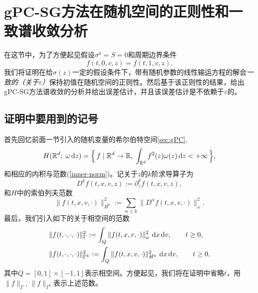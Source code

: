 


\section{gPC-SG方法在随机空间的正则性和一致谱收敛分析}\label{sec:unif}

在这节中，为了方便起见假设$\sigma^a=S=0$和周期边界条件
\begin{equation}\label{PBC}
  f(t, 0, v, z) = f(t, 1, v, z).
\end{equation}
我们将证明在给$\sigma(z)$一定的假设条件下，带有随机参数的线性输运方程的解会{\it 一致的（关于$\varepsilon$）}保持初值在随机空间的正则性。然后基于该正则性的结果，给出gPC-SG方法谱收敛的分析并给出误差估计，并且该误差估计是不依赖于$\varepsilon$的。

\subsection{证明中要用到的记号}
首先回忆前面一节引入的随机变量的希尔伯特空间\ref{sec:gPC},
\begin{equation}
  H({\mathbb{R}}^d;\;\omega\mathop{}\!\mathrm{d} z) = \Big\{\,f\mid {\mathbb{R}}^d \rightarrow {\mathbb{R}}, \;\int_{{\mathbb{R}}^d} f^2(z)\omega(z)\mathop{}\!\mathrm{d} z < +\infty\,\Big\},
\end{equation}
和相应的内积与范数(\ref{inner-norm})。记关于$z$的$k$阶求导算子为
\begin{equation}
  D^k f(t,x,v,z) := \partial^k_z f(t,x,v,z),
\end{equation}
和$H$中的索伯列夫范数
\begin{equation}
  \|f(t,x,v,\cdot)\|_{H^k}^2 := \sum_{\alpha\le k} \|D^\alpha f(t,x,v,\cdot)\|_\omega^2.
\end{equation}
最后，我们引入如下的关于相空间的范数
\begin{align}
  & \|f(t,\cdot,\cdot,\cdot)\|_{\Gamma}^2:=\int_Q \|f(t,x,v,\cdot)\|_{\omega}^2\,\mathop{}\!\mathrm{d} x\mathop{}\!\mathrm{d} v,\qquad t\geq 0,
  \\
  & \|f(t,\cdot,\cdot,\cdot)\|_{\Gamma^k}^2:=\int_Q \|f(t,x,v,\cdot)\|_{H^k}^2\,\mathop{}\!\mathrm{d} x\mathop{}\!\mathrm{d} v,\qquad t\geq 0,
\end{align}
其中$Q=[0,1]\times [-1,1]$表示相空间。方便起见，我们将在证明中省略$t$，用$\|f\|_\Gamma$, $\|f\|_{\Gamma^k}$表示上述范数。

